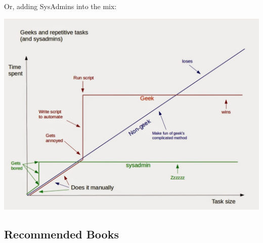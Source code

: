 \documentclass[handout]{beamer}
\begin{document}
\begin{frame}
Or, adding SysAdmins into the mix:

\centering
\vspace{10pt}
\includegraphics[height=0.8\textheight]{Geeks2.jpg}

\end{frame}


\subsection{Recommended Books}
\end{document}
